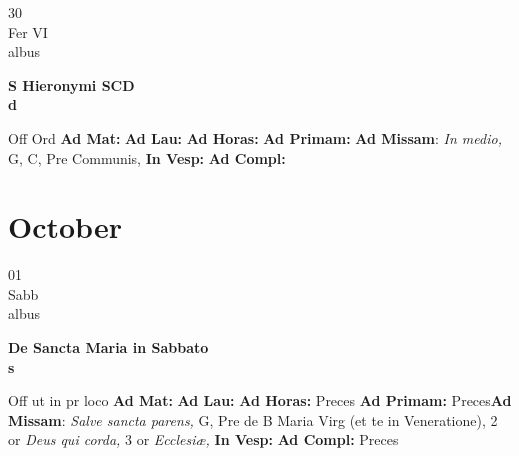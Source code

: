 \documentclass[10pt, openany]{book}
\begin{document}
    \begin{center}
        \begin{minipage}{3.5in}
            \vspace{2em}
            \begin{minipage}{0.5in}
                {\Huge 30} \\
                {\normalsize Fer VI} \\
                {\normalsize albus}
            \end{minipage}
            \begin{minipage}{3.0in}
                \textbf{ \large S Hieronymi SCD \\
                \textnormal{\normalsize d}} \\ 
            \end{minipage}
            \begin{justify}Off Ord
                \textbf{Ad Mat: }
                \textbf{Ad Lau: }
                \textbf{Ad Horas: }
                \textbf{Ad Primam: }\textbf{Ad Missam}: \textit{In medio,} G, C, Pre Communis,  
                \textbf{In Vesp: }
                \textbf{Ad Compl: }
            \end{justify}
        \end{minipage}
    \end{center}

    \chapter{October}
                    
    \begin{center}
        \begin{minipage}{3.5in}
            \vspace{2em}
            \begin{minipage}{0.5in}
                {\Huge 01} \\
                {\normalsize Sabb} \\
                {\normalsize albus}
            \end{minipage}
            \begin{minipage}{3.0in}
                \textbf{ \large De Sancta Maria in Sabbato \\
                \textnormal{\normalsize s}} \\ 
            \end{minipage}
            \begin{justify}Off ut in pr loco
                \textbf{Ad Mat: }
                \textbf{Ad Lau: }
                \textbf{Ad Horas: }Preces
                \textbf{Ad Primam: }Preces\textbf{Ad Missam}: \textit{Salve sancta parens,} G, Pre de B Maria Virg (et te in Veneratione), 2 or \textit{Deus qui corda,} 3 or \textit{Ecclesiæ,}  
                \textbf{In Vesp: }
                \textbf{Ad Compl: }Preces
            \end{justify}
        \end{minipage}
    \end{center}
\end{document}
